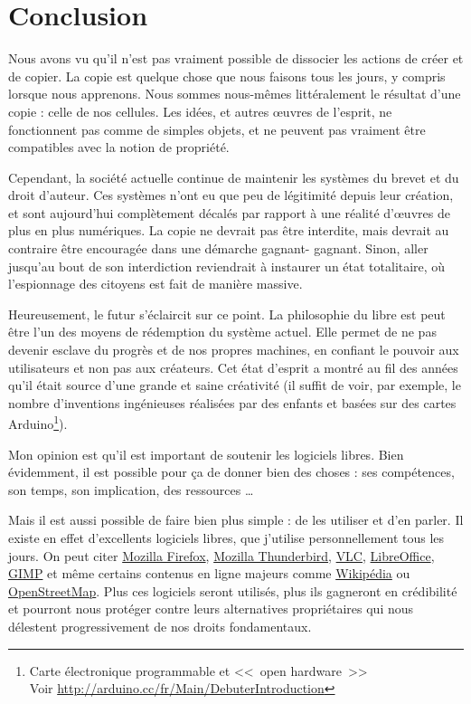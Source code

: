 \chapter*{Conclusion}

Nous avons vu qu'il n'est pas vraiment possible de dissocier les actions de créer et de copier.
La copie est quelque chose que nous faisons tous les jours, y compris lorsque nous apprenons.
Nous sommes nous-mêmes littéralement le résultat d'une copie : celle de nos cellules.
Les idées, et autres œuvres de l'esprit, ne fonctionnent pas comme de simples objets, et ne peuvent pas vraiment être compatibles avec la notion de propriété.

Cependant, la société actuelle continue de maintenir les systèmes du brevet et du droit d'auteur.
Ces systèmes n'ont eu que peu de légitimité depuis leur création, et sont aujourd'hui complètement décalés par rapport à une réalité d'œuvres de plus en plus numériques.
La copie ne devrait pas être interdite, mais devrait au contraire être encouragée dans une démarche gagnant- gagnant.
Sinon, aller jusqu'au bout de son interdiction reviendrait à instaurer un état totalitaire, où l'espionnage des citoyens est fait de manière massive.

Heureusement, le futur s'éclaircit sur ce point.
La philosophie du libre est peut être l'un des moyens de rédemption du système actuel.
Elle permet de ne pas devenir esclave du progrès et de nos propres machines, en confiant le pouvoir aux utilisateurs et non pas aux créateurs.
Cet état d'esprit a montré au fil des années qu'il était source d'une grande et saine créativité (il suffit de voir, par exemple, le nombre d'inventions ingénieuses réalisées par des enfants et basées sur des cartes Arduino\footnote{Carte électronique programmable et <<~open hardware~>>\\Voir \url{http://arduino.cc/fr/Main/DebuterIntroduction}}).

Mon opinion est qu'il est important de soutenir les logiciels libres.
Bien évidemment, il est possible pour ça de donner bien des choses : ses compétences, son temps, son implication, des ressources \dots{}

Mais il est aussi possible de faire bien plus simple : de les utiliser et d'en parler.
Il existe en effet d'excellents logiciels libres, que j'utilise personnellement tous les jours.
On peut citer \href{https://www.mozilla.org/fr/firefox/new/}{Mozilla Firefox}, \href{https://www.mozilla.org/fr/thunderbird/}{Mozilla Thunderbird}, \href{https://www.videolan.org/vlc/}{VLC}, \href{http://fr.libreoffice.org/}{LibreOffice}, \href{http://www.gimp.org/}{GIMP} et même certains contenus en ligne majeurs comme \href{https://fr.wikipedia.org/}{Wikipédia} ou \href{http://www.openstreetmap.org/}{OpenStreetMap}.
Plus ces logiciels seront utilisés, plus ils gagneront en crédibilité et pourront nous protéger contre leurs alternatives propriétaires qui nous délestent progressivement de nos droits fondamentaux.

